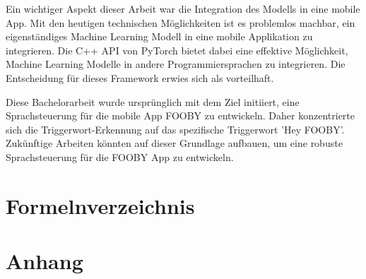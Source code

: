\documentclass[11pt,a4paper]{article}
\begin{document}
\noindent \newline
Ein wichtiger Aspekt dieser Arbeit war die Integration des Modells in eine mobile App. Mit den 
heutigen technischen Möglichkeiten ist es problemlos machbar, ein eigenständiges Machine Learning 
Modell in eine mobile Applikation zu integrieren. Die C++ API von PyTorch bietet dabei eine 
effektive Möglichkeit, Machine Learning Modelle in andere Programmiersprachen zu integrieren. Die 
Entscheidung für dieses Framework erwies sich als vorteilhaft.

\noindent \newline
Diese Bachelorarbeit wurde ursprünglich mit dem Ziel initiiert, eine Sprachsteuerung für die mobile 
App FOOBY zu entwickeln. Daher konzentrierte sich die Triggerwort-Erkennung auf das spezifische 
Triggerwort 'Hey FOOBY'. Zukünftige Arbeiten könnten auf dieser Grundlage aufbauen, um eine robuste 
Sprachsteuerung für die FOOBY App zu entwickeln.

\clearpage


\printbibliography[title=Literaturverzeichnis, heading=bibintoc]

\listoffigures

\listoftables

\section*{Formelnverzeichnis}
\vspace{-6ex}
\listofformulas



\newpage \section{Anhang}
\end{document}
